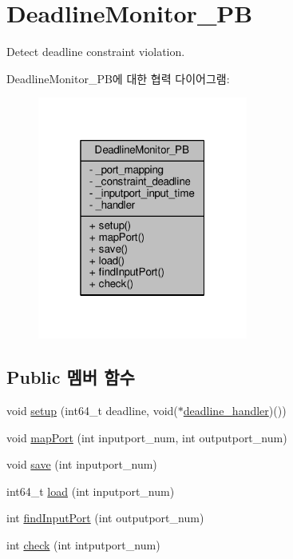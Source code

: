\hypertarget{classDeadlineMonitor__PB}{}\section{Deadline\+Monitor\+\_\+\+PB}
\label{classDeadlineMonitor__PB}


Detect deadline constraint violation.  




Deadline\+Monitor\+\_\+\+P\+B에 대한 협력 다이어그램\+:\nopagebreak
\begin{figure}[H]
\begin{center}
\leavevmode
\includegraphics[width=196pt]{classDeadlineMonitor__PB__coll__graph}
\end{center}
\end{figure}
\subsection*{Public 멤버 함수}
\begin{DoxyCompactItemize}
\item 
void \hyperlink{classDeadlineMonitor__PB_a6456b87d4c185b8a974f71cc7e729d83}{setup} (int64\+\_\+t deadline, void($\ast$\hyperlink{sample__main_8cpp_ae298e0b16475a05fd3d021c2daf90062}{deadline\+\_\+handler})())
\item 
void \hyperlink{classDeadlineMonitor__PB_a9e1fb5351877e803ba40357fff46d19a}{map\+Port} (int inputport\+\_\+num, int outputport\+\_\+num)
\item 
void \hyperlink{classDeadlineMonitor__PB_aa100310cce2b5c63a13edc18d38483e4}{save} (int inputport\+\_\+num)
\item 
int64\+\_\+t \hyperlink{classDeadlineMonitor__PB_aa438c96cf364469c2da17070d358cd09}{load} (int inputport\+\_\+num)
\item 
int \hyperlink{classDeadlineMonitor__PB_aa42200d62a805c2bf6eaeb7eb3841305}{find\+Input\+Port} (int outputport\+\_\+num)
\item 
int \hyperlink{classDeadlineMonitor__PB_a7debcade9bbf07add3752aa980bc3b19}{check} (int intputport\+\_\+num)
\end{DoxyCompactItemize}
